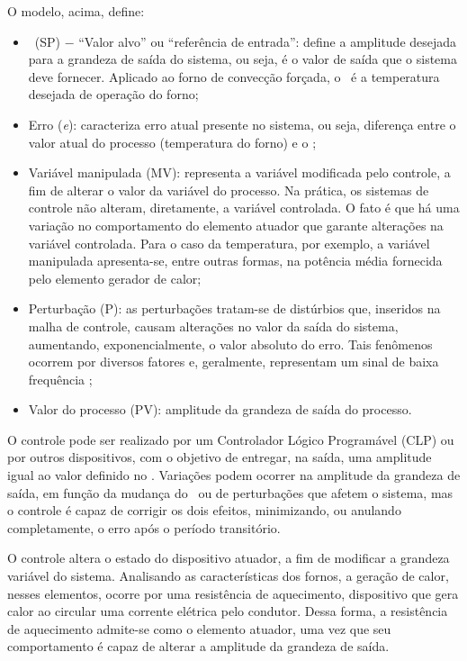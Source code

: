         O modelo, acima, define:
        \begin{itemize}
            \item \SetPoint \ (SP) $-$ “Valor alvo” ou “referência de entrada”: define a amplitude desejada para a grandeza de saída do sistema, ou seja, é o valor de saída que o sistema deve fornecer. Aplicado ao forno de convecção forçada, o \SetPoint \ é a temperatura desejada de operação do forno; 
            \item Erro (\textit{e}): caracteriza erro atual presente no sistema, ou seja, diferença entre o valor atual do processo (temperatura do forno) e o \SetPoint;
            \item Variável manipulada (MV): representa a variável modificada pelo controle, a fim de alterar o valor da variável do processo. Na prática, os sistemas de controle não alteram, diretamente, a variável controlada. O fato é que há uma variação no comportamento do elemento atuador que garante alterações na variável controlada. Para o caso da temperatura, por exemplo, a variável manipulada apresenta-se, entre outras formas, na potência média fornecida pelo elemento gerador de calor;
            \item Perturbação (P): as perturbações tratam-se de distúrbios que, inseridos na malha de controle, causam alterações no valor da saída do sistema, aumentando, exponencialmente, o valor absoluto do erro. Tais fenômenos ocorrem por diversos fatores e, geralmente, representam um sinal de baixa frequência \cite{TCC_Controle1};
            \item Valor do processo (PV): amplitude da grandeza de saída do processo. 
        \end{itemize}
    
        O controle pode ser realizado por um Controlador Lógico Programável (CLP) ou por outros dispositivos, com o objetivo de entregar, na saída, uma amplitude igual ao valor definido no \SetPoint. Variações podem ocorrer na amplitude da grandeza de saída, em função da mudança do \SetPoint \ ou de perturbações que afetem o sistema, mas o controle é capaz de corrigir os dois efeitos, minimizando, ou anulando completamente, o erro após o período transitório. 
        
        O controle altera o estado do dispositivo atuador, a fim de modificar a grandeza variável do sistema. Analisando as características dos fornos, a geração de calor, nesses elementos, ocorre por uma resistência de aquecimento, dispositivo que gera calor ao circular uma corrente elétrica pelo condutor. Dessa forma, a resistência de aquecimento admite-se como o elemento atuador, uma vez que seu comportamento é capaz de alterar a amplitude da grandeza de saída.
        
